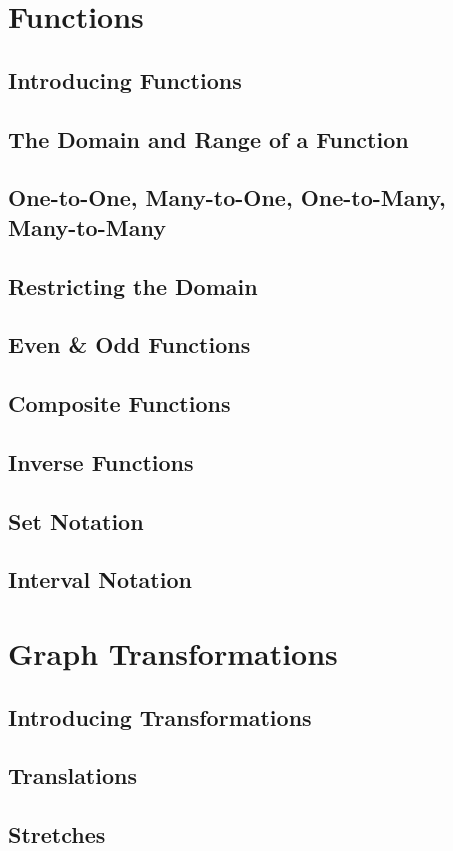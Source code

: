 \documentclass[../maths.tex]{subfiles}
\begin{document}
\section{Functions}
\subsection*{Introducing Functions}
\subsection*{The Domain and Range of a Function}
\subsection*{One-to-One, Many-to-One, One-to-Many, Many-to-Many}
\subsection*{Restricting the Domain}
\subsection*{Even \& Odd Functions}
\subsection*{Composite Functions}
\subsection*{Inverse Functions}
\subsection*{Set Notation}
\subsection*{Interval Notation}
\section{Graph Transformations}
\subsection*{Introducing Transformations}
\subsection*{Translations}
\subsection*{Stretches}
\end{document}
